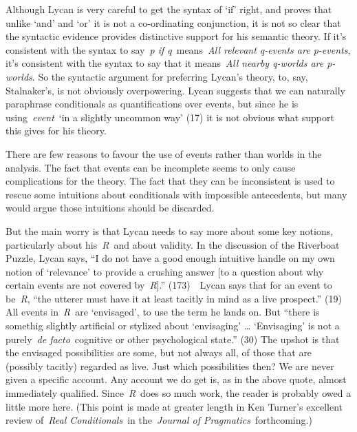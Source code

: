 \documentclass[
  11pt,
  letterpaper,
  DIV=11,
  numbers=noendperiod,
  twoside]{scrartcl}
\begin{document}
Although Lycan is very careful to get the syntax of `if' right, and
proves that unlike `and' and `or' it is not a co-ordinating conjunction,
it is not so clear that the syntactic evidence provides distinctive
support for his semantic theory. If it's consistent with the syntax to
say~\emph{p if q}~means~\emph{All relevant q-events are p-events}, it's
consistent with the syntax to say that it means~\emph{All nearby
q-worlds are p-worlds}. So the syntactic argument for preferring Lycan's
theory, to, say, Stalnaker's, is not obviously overpowering. Lycan
suggests that we can naturally paraphrase conditionals as
quantifications over events, but since he is using~\emph{event}~`in a
slightly uncommon way' (17) it is not obvious what support this gives
for his theory.

There are few reasons to favour the use of events rather than worlds in
the analysis. The fact that events can be incomplete seems to only cause
complications for the theory. The fact that they can be inconsistent is
used to rescue some intuitions about conditionals with impossible
antecedents, but many would argue those intuitions should be discarded.

But the main worry is that Lycan needs to say more about some key
notions, particularly about his~\emph{R}~and about validity. In the
discussion of the Riverboat Puzzle, Lycan says, ``I do not have a good
enough intuitive handle on my own notion of `relevance' to provide a
crushing answer {[}to a question about why certain events are not
covered by~\emph{R}{]}.'' (173)~~Lycan says that for an event to
be~\emph{R}, ``the utterer must have it at least tacitly in mind as a
live prospect.'' (19) All events in~\emph{R}~are `envisaged', to use the
term he lands on. But ``there is somethig slightly artificial or
stylized about `envisaging' \ldots{} `Envisaging' is not a
purely~\emph{de facto}~cognitive or other psychological state.'' (30)
The upshot is that the envisaged possibilities are some, but not always
all, of those that are (possibly tacitly) regarded as live. Just which
possibilities then? We are never given a specific account. Any account
we do get is, as in the above quote, almost immediately qualified.
Since~\emph{R}~does so much work, the reader is probably owed a little
more here. (This point is made at greater length in Ken Turner's
excellent review of~\emph{Real Conditionals}~in the~\emph{Journal of
Pragmatics}~forthcoming.)
\end{document}
